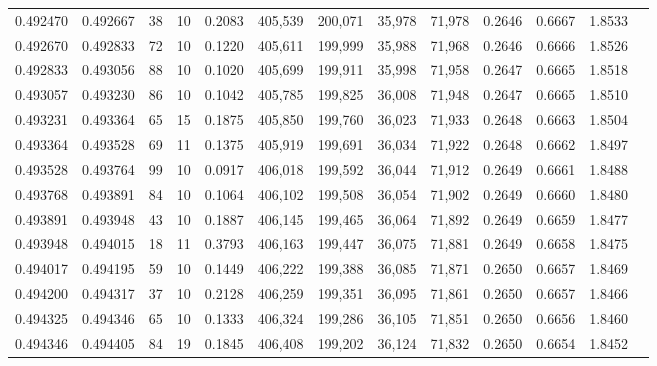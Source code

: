 \begin{tabular}{rrrrrrrrrrrrr}
0.492470 & 0.492667 &    38 &  10 &                                     0.2083 & 405,539 & 200,071 &  35,978 &  71,978 & 0.2646 & 0.6667 & 1.8533 \\
0.492670 & 0.492833 &    72 &  10 &                                     0.1220 & 405,611 & 199,999 &  35,988 &  71,968 & 0.2646 & 0.6666 & 1.8526 \\
0.492833 & 0.493056 &    88 &  10 &                                     0.1020 & 405,699 & 199,911 &  35,998 &  71,958 & 0.2647 & 0.6665 & 1.8518 \\
0.493057 & 0.493230 &    86 &  10 &                                     0.1042 & 405,785 & 199,825 &  36,008 &  71,948 & 0.2647 & 0.6665 & 1.8510 \\
0.493231 & 0.493364 &    65 &  15 &                                     0.1875 & 405,850 & 199,760 &  36,023 &  71,933 & 0.2648 & 0.6663 & 1.8504 \\
0.493364 & 0.493528 &    69 &  11 &                                     0.1375 & 405,919 & 199,691 &  36,034 &  71,922 & 0.2648 & 0.6662 & 1.8497 \\
0.493528 & 0.493764 &    99 &  10 &                                     0.0917 & 406,018 & 199,592 &  36,044 &  71,912 & 0.2649 & 0.6661 & 1.8488 \\
0.493768 & 0.493891 &    84 &  10 &                                     0.1064 & 406,102 & 199,508 &  36,054 &  71,902 & 0.2649 & 0.6660 & 1.8480 \\
0.493891 & 0.493948 &    43 &  10 &                                     0.1887 & 406,145 & 199,465 &  36,064 &  71,892 & 0.2649 & 0.6659 & 1.8477 \\
0.493948 & 0.494015 &    18 &  11 &                                     0.3793 & 406,163 & 199,447 &  36,075 &  71,881 & 0.2649 & 0.6658 & 1.8475 \\
0.494017 & 0.494195 &    59 &  10 &                                     0.1449 & 406,222 & 199,388 &  36,085 &  71,871 & 0.2650 & 0.6657 & 1.8469 \\
0.494200 & 0.494317 &    37 &  10 &                                     0.2128 & 406,259 & 199,351 &  36,095 &  71,861 & 0.2650 & 0.6657 & 1.8466 \\
0.494325 & 0.494346 &    65 &  10 &                                     0.1333 & 406,324 & 199,286 &  36,105 &  71,851 & 0.2650 & 0.6656 & 1.8460 \\
0.494346 & 0.494405 &    84 &  19 &                                     0.1845 & 406,408 & 199,202 &  36,124 &  71,832 & 0.2650 & 0.6654 & 1.8452 \\

\end{tabular}
